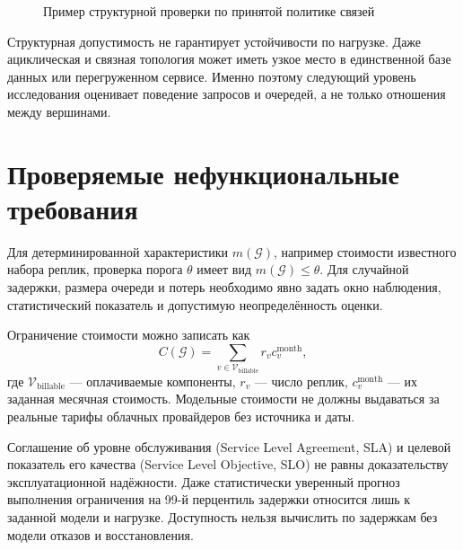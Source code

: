 \begin{figure}[htbp]
\centering
{}
\caption{Пример структурной проверки по принятой политике связей}
\label{fig:connection_rules}
\end{figure}

Структурная допустимость не гарантирует устойчивости по нагрузке. Даже ациклическая и связная топология может иметь узкое место в единственной базе данных или перегруженном сервисе. Именно поэтому следующий уровень исследования оценивает поведение запросов и очередей, а не только отношения между вершинами.

\section{Проверяемые нефункциональные требования}

Для детерминированной характеристики $m(\mathcal{G})$, например стоимости известного набора реплик, проверка порога $\theta$ имеет вид $m(\mathcal{G})\leq\theta$. Для случайной задержки, размера очереди и потерь необходимо явно задать окно наблюдения, статистический показатель и допустимую неопределённость оценки.

Ограничение стоимости можно записать как
\begin{equation}
C(\mathcal{G})=\sum_{v\in\mathcal{V}_{\mathrm{billable}}}r_v c_v^{\mathrm{month}},
\end{equation}
где $\mathcal{V}_{\mathrm{billable}}$ --- оплачиваемые компоненты, $r_v$ --- число реплик, $c_v^{\mathrm{month}}$ --- их заданная месячная стоимость. Модельные стоимости не должны выдаваться за реальные тарифы облачных провайдеров без источника и даты.

Соглашение об уровне обслуживания (Service Level Agreement, SLA) и целевой показатель его качества (Service Level Objective, SLO) не равны доказательству эксплуатационной надёжности. Даже статистически уверенный прогноз выполнения ограничения на 99-й перцентиль задержки относится лишь к заданной модели и нагрузке. Доступность нельзя вычислить по задержкам без модели отказов и восстановления.

